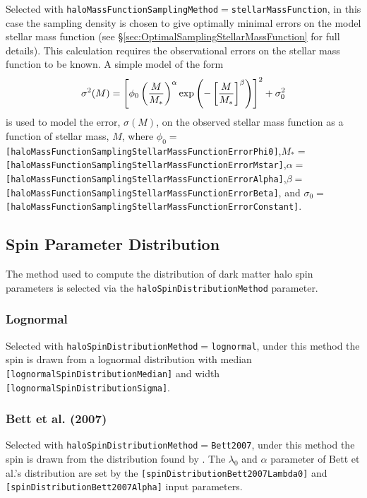 Selected with {\tt haloMassFunctionSamplingMethod}$=${\tt stellarMassFunction}, in this case the sampling density is chosen to give optimally minimal errors on the model stellar mass function (see \S\ref{sec:OptimalSamplingStellarMassFunction} for full details). This calculation requires the observational errors on the stellar mass function to be known. A simple model of the form
\begin{equation}
 \sigma^2(M) = \left[\phi_0 \left({M\over M_*}\right)^\alpha \exp\left(-\left[{M\over M_*}\right]^\beta\right)\right]^2 + \sigma_0^2
\end{equation}
is used to model the error, $\sigma(M)$, on the observed stellar mass function as a function of stellar mass, $M$, where $\phi_0=${\tt [haloMassFunctionSamplingStellarMassFunctionErrorPhi0]},$M_*=${\tt [haloMassFunctionSamplingStellarMassFunctionErrorMstar]},$\alpha=${\tt [haloMassFunctionSamplingStellarMassFunctionErrorAlpha]},$\beta=${\tt [haloMassFunctionSamplingStellarMassFunctionErrorBeta]}, and $\sigma_0=${\tt [haloMassFunctionSamplingStellarMassFunctionErrorConstant]}.

\subsection{Spin Parameter Distribution}\label{sec:SpinParameterDistribution}

The method used to compute the distribution of dark matter halo spin parameters is selected via the {\tt haloSpinDistributionMethod} parameter.

\subsubsection{Lognormal}

Selected with {\tt haloSpinDistributionMethod}$=${\tt lognormal}, under this method the spin is drawn from a lognormal distribution with median {\tt [lognormalSpinDistributionMedian]} and width {\tt [lognormalSpinDistributionSigma]}.

\subsubsection{Bett et al. (2007)}

Selected with {\tt haloSpinDistributionMethod}$=${\tt Bett2007}, under this method the spin is drawn from the distribution found by \cite{bett_spin_2007}. The $\lambda_0$ and $\alpha$ parameter of Bett et al.'s distribution are set by the {\tt [spinDistributionBett2007Lambda0]} and {\tt [spinDistributionBett2007Alpha]} input parameters.

